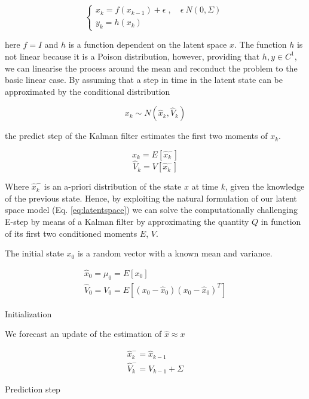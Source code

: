 \documentclass[mscthesis]{usiinfthesis}
\begin{document}
\begin{eqfloat}
\begin{equation}
    \begin{cases}
      x_k = f(x_{k-1}) + \epsilon \; , \quad \epsilon ~ N(0, \Sigma) \\
      y_k = h(x_k) 
    \end{cases}\,
\label{eq:latentspace2}
\end{equation}
\end{eqfloat}

here $f = I$ and $h$ is a function dependent on the latent space $x$. The function $h$ is not linear because it is a Poison distribution, however, providing that $h, y \in C^1$, we can linearise the process around the mean and reconduct the problem to the basic linear case. By assuming that a step in time in the latent state can be approximated by the conditional distribution 

\[
x_{k} \sim N( \hat{x}_k, \hat{V}_k)
\]

the predict step of the Kalman filter estimates the first two moments of $x_k$. 

\[
\hat{x}_k = E[\hat{x}^-_k]
\]
\[
\hat{V}_k = V[\hat{x}^-_k]
\]

Where $\hat{x}^-_k$  is an a-priori distribution of the state $x$ at time $k$, given the knowledge of the previous state. Hence, by exploiting the natural formulation of our latent space model (Eq. \ref{eq:latentspace}) we can solve the computationally challenging E-step by means of a Kalman filter by approximating the quantity $Q$ in function of its first two conditioned moments $E$, $V$. 

The initial state $x_0$ is a random vector with a known mean and variance.

\begin{eqfloat}
\begin{equation}
\begin{array}{l}
\hat{x}_0 = \mu_0 = E[x_0] \\
\hat{V}_0 = V_0 = E[(x_0-\hat{x}_0)(x_0-\hat{x}_0)^T] 
\end{array}
\label{eq:kalman_init}
\end{equation}
\caption{Initialization}
\end{eqfloat}

We forecast an update of the estimation of $\hat{x} \approx x$

\begin{eqfloat}[H]
\begin{equation}
\begin{array}{l}
\hat{x}_k^- = \hat{x}_{k-1} \\
\hat{V}_k^- =  V_{k-1} + \Sigma
\end{array}
\end{equation}
\caption{Prediction step}
\label{eq:ext_kalmann_prediction}
\end{eqfloat}
\end{document}
